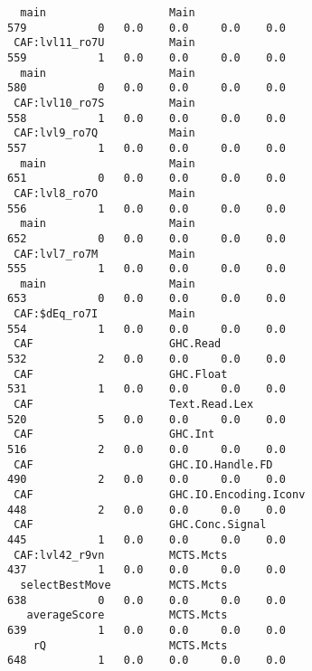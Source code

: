 \begin{tiny}
\begin{verbatim}
  main                   Main                                                 579           0   0.0    0.0     0.0    0.0
 CAF:lvl11_ro7U          Main                                                 559           1   0.0    0.0     0.0    0.0
  main                   Main                                                 580           0   0.0    0.0     0.0    0.0
 CAF:lvl10_ro7S          Main                                                 558           1   0.0    0.0     0.0    0.0
 CAF:lvl9_ro7Q           Main                                                 557           1   0.0    0.0     0.0    0.0
  main                   Main                                                 651           0   0.0    0.0     0.0    0.0
 CAF:lvl8_ro7O           Main                                                 556           1   0.0    0.0     0.0    0.0
  main                   Main                                                 652           0   0.0    0.0     0.0    0.0
 CAF:lvl7_ro7M           Main                                                 555           1   0.0    0.0     0.0    0.0
  main                   Main                                                 653           0   0.0    0.0     0.0    0.0
 CAF:$dEq_ro7I           Main                                                 554           1   0.0    0.0     0.0    0.0
 CAF                     GHC.Read                                             532           2   0.0    0.0     0.0    0.0
 CAF                     GHC.Float                                            531           1   0.0    0.0     0.0    0.0
 CAF                     Text.Read.Lex                                        520           5   0.0    0.0     0.0    0.0
 CAF                     GHC.Int                                              516           2   0.0    0.0     0.0    0.0
 CAF                     GHC.IO.Handle.FD                                     490           2   0.0    0.0     0.0    0.0
 CAF                     GHC.IO.Encoding.Iconv                                448           2   0.0    0.0     0.0    0.0
 CAF                     GHC.Conc.Signal                                      445           1   0.0    0.0     0.0    0.0
 CAF:lvl42_r9vn          MCTS.Mcts                                            437           1   0.0    0.0     0.0    0.0
  selectBestMove         MCTS.Mcts                                            638           0   0.0    0.0     0.0    0.0
   averageScore          MCTS.Mcts                                            639           1   0.0    0.0     0.0    0.0
    rQ                   MCTS.Mcts                                            648           1   0.0    0.0     0.0    0.0

\end{verbatim}
\end{tiny}
